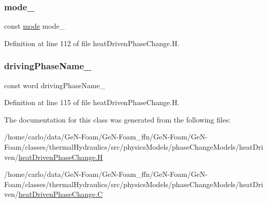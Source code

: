 \subsubsection{\texorpdfstring{mode\+\_\+}{mode\_}}
{\footnotesize\ttfamily const \hyperlink{classFoam_1_1phaseChangeModels_1_1heatDrivenPhaseChange_a1a6b6fb557d8d37d59700faf4e4c9167}{mode} mode\+\_\+\hspace{0.3cm}{\ttfamily [protected]}}



Definition at line 112 of file heat\+Driven\+Phase\+Change.\+H.

\mbox{\label{classFoam_1_1phaseChangeModels_1_1heatDrivenPhaseChange_a7c4fcdfff2b2905fe513bfe02a8d64b7}} 
\subsubsection{\texorpdfstring{driving\+Phase\+Name\+\_\+}{drivingPhaseName\_}}
{\footnotesize\ttfamily const word driving\+Phase\+Name\+\_\+\hspace{0.3cm}{\ttfamily [protected]}}



Definition at line 115 of file heat\+Driven\+Phase\+Change.\+H.



The documentation for this class was generated from the following files\+:\begin{DoxyCompactItemize}
\item 
/home/carlo/data/\+Ge\+N-\/\+Foam/\+Ge\+N-\/\+Foam\+\_\+ffn/\+Ge\+N-\/\+Foam/\+Ge\+N-\/\+Foam/classes/thermal\+Hydraulics/src/physics\+Models/phase\+Change\+Models/heat\+Driven/\hyperlink{heatDrivenPhaseChange_8H}{heat\+Driven\+Phase\+Change.\+H}\item 
/home/carlo/data/\+Ge\+N-\/\+Foam/\+Ge\+N-\/\+Foam\+\_\+ffn/\+Ge\+N-\/\+Foam/\+Ge\+N-\/\+Foam/classes/thermal\+Hydraulics/src/physics\+Models/phase\+Change\+Models/heat\+Driven/\hyperlink{heatDrivenPhaseChange_8C}{heat\+Driven\+Phase\+Change.\+C}\end{DoxyCompactItemize}
